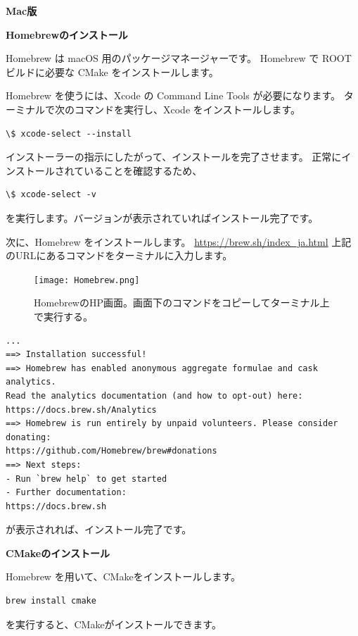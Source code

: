 \documentclass[uplatex,10pt,a4j]{jsarticle}
\begin{document}
\vspace{0.5cm}

\vspace{1cm}
{\large \bf Mac版}
\normalsize{}

\vspace{0.5cm}
{\bf Homebrewのインストール}
\vspace{0.3cm}

Homebrew は macOS 用のパッケージマネージャーです。
Homebrew で ROOT ビルドに必要な CMake をインストールします。\par
Homebrew を使うには、Xcode の Command Line Tools が必要になります。
ターミナルで次のコマンドを実行し、Xcode をインストールします。
\begin{lstlisting}
\$ xcode-select --install
\end{lstlisting}
インストーラーの指示にしたがって、インストールを完了させます。
正常にインストールされていることを確認するため、
\begin{lstlisting}
\$ xcode-select -v
\end{lstlisting}
を実行します。バージョンが表示されていればインストール完了です。\par
次に、Homebrew をインストールします。
\url{https://brew.sh/index_ja.html}
上記のURLにあるコマンドをターミナルに入力します。
\begin{figure}[h]
  \begin{center}
    \texttt{[image: Homebrew.png]}
    \caption{HomebrewのHP画面。画面下のコマンドをコピーしてターミナル上で実行する。}
  \end{center}
\end{figure}
\begin{lstlisting}[caption=Homebrewインストール時のスクリプト]
...
==> Installation successful!
==> Homebrew has enabled anonymous aggregate formulae and cask analytics.
Read the analytics documentation (and how to opt-out) here:
https://docs.brew.sh/Analytics
==> Homebrew is run entirely by unpaid volunteers. Please consider donating:
https://github.com/Homebrew/brew#donations
==> Next steps:
- Run `brew help` to get started
- Further documentation:
https://docs.brew.sh
\end{lstlisting}

が表示されれば、インストール完了です。\par

\vspace{0.5cm}
{\bf CMakeのインストール}
\vspace{0.3cm}

Homebrew を用いて、CMakeをインストールします。
\begin{lstlisting}
brew install cmake
\end{lstlisting}
を実行すると、CMakeがインストールできます。
\end{document}

